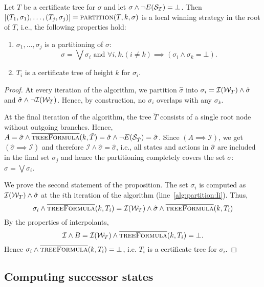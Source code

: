 \begin{proposition}\label{prop:partition}
    Let $T$ be a certificate tree for $\sigma$ and let $\sigma \land \lnot E(\mathcal{S}_T) = \bot$. Then $[(T_1, \sigma_1),\ldots,(T_j, \sigma_j)] = \textsc{partition}(T, k, \sigma)$ is a local winning strategy in the root of $T$, i.e., the following properties hold:
    \begin{enumerate}
        \item $\sigma_1 ,\ldots, \sigma_j$ is a partitioning of
            $\sigma$: $$\sigma = \bigvee \sigma_i \text{ and } \forall i, k. (i \neq k) \implies (\sigma_i \land \sigma_k = \bot).$$
        \item $T_i$ is a certificate tree of height $k$ for $\sigma_i$.
    \end{enumerate}
\end{proposition}
\begin{proof}
    At every iteration of the algorithm, we partition $\hat{\sigma}$ into $\sigma_i = \mathcal{I}(\mathcal{W}_T) \land \hat{\sigma}$ and $\hat{\sigma} \land \neg\mathcal{I}(\mathcal{W}_T)$. Hence, by construction, no $\sigma_i$ overlaps with any $\sigma_k$.

    At the final iteration of the algorithm, the tree $\tilde{T}$ consists of a single root node without outgoing branches.  Hence, $A = \hat{\sigma} \land \textsc{$\overline{\mbox{treeFormula}}$}(k, \tilde{T}) = \hat{\sigma} \land \neg E(\mathcal{S}_{\tilde{T}}) = \hat{\sigma}$.  Since $(A \implies \mathcal{I})$, we get $(\hat{\sigma} \implies \mathcal{I})$ and therefore $\mathcal{I} \land \hat{\sigma} = \hat{\sigma}$, i.e., all states and actions in $\hat{\sigma}$ are included in the final set $\sigma_j$ and hence the partitioning completely covers the set $\sigma$: $\sigma=\bigvee \sigma_i$.

    We prove the second statement of the proposition.  The set $\sigma_i$ is computed as $\mathcal{I}(\mathcal{W}_T) \land \hat{\sigma}$ at the $i$th iteration of the algorithm (line~\ref{alg:partition:Ii}).
    Thus, $$\sigma_i \land \textsc{$\overline{\mbox{treeFormula}}$}(k, T_i) = \mathcal{I}(\mathcal{W}_T) \land \hat{\sigma} \land \textsc{$\overline{\mbox{treeFormula}}$}(k, T_i)$$ By the properties of interpolants, $$\mathcal{I} \land B = \mathcal{I}(\mathcal{W}_T) \land \textsc{$\overline{\mbox{treeFormula}}$}(k, T_i) = \bot.$$  Hence $\sigma_i \land \textsc{$\overline{\mbox{treeFormula}}$}(k, T_i) = \bot$, i.e. $T_i$ is a certificate tree for $\sigma_i$.
\end{proof}

\subsection{Computing successor states}

